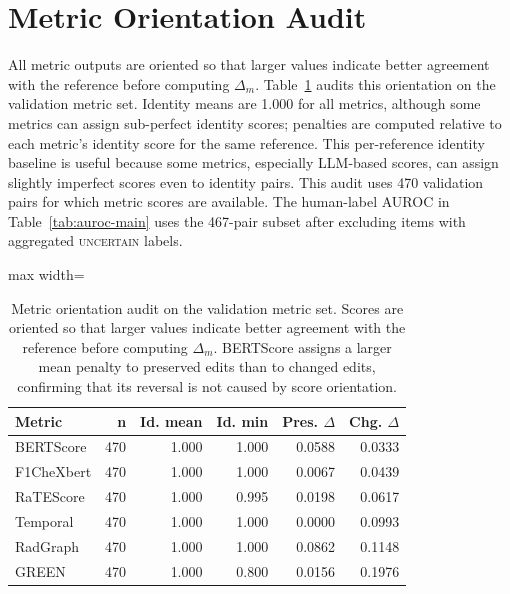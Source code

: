 \documentclass[11pt]{article}
\newcommand{\uncertain}{\textsc{uncertain}\xspace}
\begin{document}
\section{Metric Orientation Audit}
\label{app:metric-orientation}

All metric outputs are oriented so that larger values indicate better agreement with the reference before computing $\Delta_m$.
Table~\ref{tab:metric-orientation-audit} audits this orientation on the validation metric set.
Identity means are 1.000 for all metrics, although some metrics can assign sub-perfect identity scores; penalties are computed relative to each metric's identity score for the same reference.
This per-reference identity baseline is useful because some metrics, especially LLM-based scores, can assign slightly imperfect scores even to identity pairs.
This audit uses 470 validation pairs for which metric scores are available. The human-label AUROC in Table~\ref{tab:auroc-main} uses the 467-pair subset after excluding items with aggregated \uncertain labels.

\begin{table}[H]
\centering
\scriptsize
\setlength{\tabcolsep}{2pt}
\begin{adjustbox}{max width=\columnwidth}
\begin{tabular}{lrrrrr}
\toprule
\textbf{Metric} & \textbf{n} & \textbf{Id. mean} & \textbf{Id. min} & \textbf{Pres. $\Delta$} & \textbf{Chg. $\Delta$} \\
\midrule
BERTScore & 470 & 1.000 & 1.000 & 0.0588 & 0.0333 \\
F1CheXbert & 470 & 1.000 & 1.000 & 0.0067 & 0.0439 \\
RaTEScore & 470 & 1.000 & 0.995 & 0.0198 & 0.0617 \\
Temporal & 470 & 1.000 & 1.000 & 0.0000 & 0.0993 \\
RadGraph & 470 & 1.000 & 1.000 & 0.0862 & 0.1148 \\
GREEN & 470 & 1.000 & 0.800 & 0.0156 & 0.1976 \\
\bottomrule
\end{tabular}
\end{adjustbox}
\caption{Metric orientation audit on the validation metric set. Scores are oriented so that larger values indicate better agreement with the reference before computing $\Delta_m$. BERTScore assigns a larger mean penalty to preserved edits than to changed edits, confirming that its reversal is not caused by score orientation.}
\label{tab:metric-orientation-audit}
\end{table}
\FloatBarrier
\end{document}
